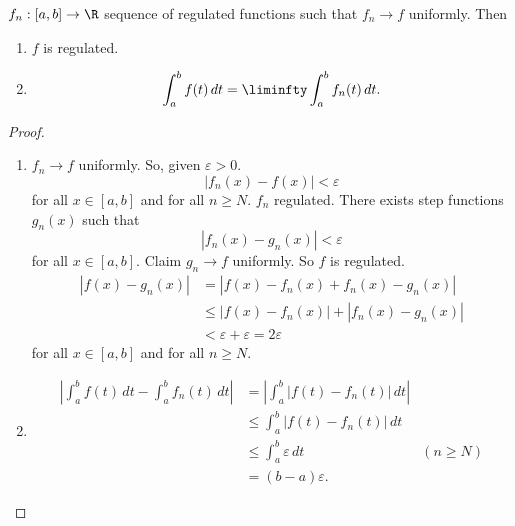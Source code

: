 \documentclass[10pt, a4paper]{article}
\begin{document}
\begin{theorem}
    $f_n : [a, b] \to \R$ sequence of regulated functions such that $f_n \to f$ uniformly.
    Then
    \begin{enumerate}[label = (\roman*)]
        \item $f$ is regulated.
        
        \item
        \[
        \int_{a}^{b}f(t)\,dt = \liminfty\int_{a}^{b}f_n(t)\,dt.
        \]
    \end{enumerate}

    \begin{proof}
        \begin{enumerate}[label = (\roman*)]
            \item
            $f_n \to f$ uniformly.
            So,
            given $\varepsilon > 0$.
            \[
            |f_n(x) - f(x)| < \varepsilon
            \]
            for all $x \in [a, b]$ and for all $n \geq N$.
            $f_n$ regulated.
            There exists step functions $g_n(x)$ such that
            \[
            |f_n(x) - g_n(x)| < \varepsilon
            \]
            for all $x \in [a, b]$.
            Claim $g_n \to f$ uniformly.
            So $f$ is regulated.
            \begin{align*}
                |f(x) - g_n(x)| &= |f(x) - f_n(x) + f_n(x) - g_n(x)| \\
                &\leq |f(x) - f_n(x)| + |f_n(x) - g_n(x)| \\
                &< \varepsilon + \varepsilon = 2\varepsilon
            \end{align*}
            for all $x \in [a, b]$ and for all $n \geq N$.

            \item
            \begin{align*}
                \left|\int_{a}^{b}f(t)\,dt - \int_{a}^{b}f_n(t)\,dt\right| &= \left|\int_{a}^{b}|f(t) - f_n(t)|\,dt\right| \\
                &\leq \int_{a}^{b}|f(t) - f_n(t)|\,dt \\
                &\leq \int_{a}^{b}\varepsilon\,dt &(n \geq N) \\
                &= (b - a)\varepsilon.
            \end{align*}
        \end{enumerate}
    \end{proof}
\end{theorem}
\end{document}
